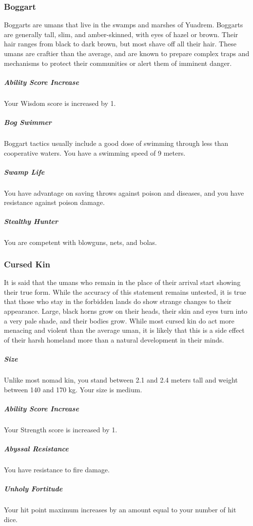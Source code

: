\subsubsection{Boggart}
Boggarts are umans that live in the swamps and marshes of Yuadrem.
Boggarts are generally tall, slim, and amber-skinned, with eyes of hazel or brown.
Their hair ranges from black to dark brown, but most shave off all their hair.
These umans are craftier than the average, and are known to prepare complex traps and mechanisms to protect their communities or alert them of imminent danger.

\subparagraph{Ability Score Increase} Your Wisdom score is increased by 1.

\subparagraph{Bog Swimmer} Boggart tactics usually include a good dose of swimming through less than cooperative waters.
You have a swimming speed of 9 meters.

\subparagraph{Swamp Life} You have advantage on saving throws against poison and diseases, and you have resistance against poison damage.

\subparagraph{Stealthy Hunter} You are competent with blowguns, nets, and bolas.

\subsubsection{Cursed Kin}
It is said that the umans who remain in the place of their arrival start showing their true form.
While the accuracy of this statement remains untested, it is true that those who stay in the forbidden lands do show strange changes to their appearance.
Large, black horns grow on their heads, their skin and eyes turn into a very pale shade, and their bodies grow.
While most cursed kin do act more menacing and violent than the average uman, it is likely that this is a side effect of their harsh homeland more than a natural development in their minds.

\subparagraph{Size} Unlike most nomad kin, you stand between 2.1 and 2.4 meters tall and weight between 140 and 170 kg.
Your size is medium.

\subparagraph{Ability Score Increase} Your Strength score is increased by 1.


\subparagraph{Abyssal Resistance} You have resistance to fire damage.

\subparagraph{Unholy Fortitude} Your hit point maximum increases by an amount equal to your number of hit dice.

